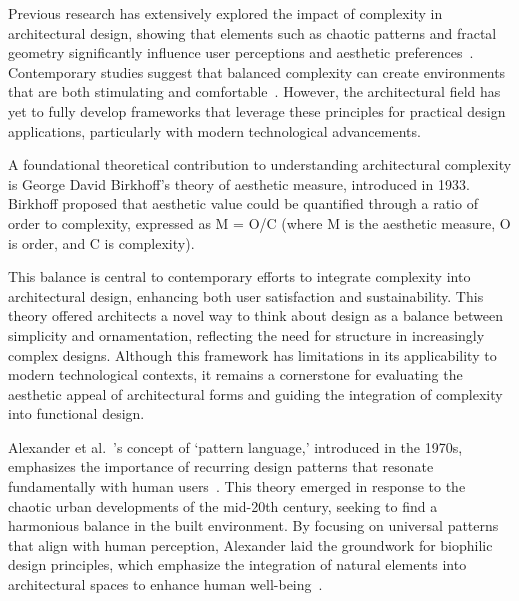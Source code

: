 

Previous research has extensively explored the impact of complexity in architectural design, showing that elements such as chaotic patterns and fractal geometry significantly influence user perceptions and aesthetic preferences~\cite{Bies2016}.
Contemporary studies suggest that balanced complexity can create environments that are both stimulating and comfortable~\cite{Redies2015}.
However, the architectural field has yet to fully develop frameworks that leverage these principles for practical design applications, particularly with modern technological advancements.

A foundational theoretical contribution to understanding architectural complexity is George David Birkhoff's theory of aesthetic measure, introduced in 1933.
Birkhoff proposed that aesthetic value could be quantified through a ratio of order to complexity, expressed as M = O/C (where M is the aesthetic measure, O is order, and C is complexity)\cite{Douchova2016}.

This balance is central to contemporary efforts to integrate complexity into architectural design, enhancing both user satisfaction and sustainability.
This theory offered architects a novel way to think about design as a balance between simplicity and ornamentation, reflecting the need for structure in increasingly complex designs.
Although this framework has limitations in its applicability to modern technological contexts, it remains a cornerstone for evaluating the aesthetic appeal of architectural forms and guiding the integration of complexity into functional design\cite{Javaheri2016}.

Alexander et al.~’s concept of `pattern language,' introduced in the 1970s, emphasizes the importance of recurring design patterns that resonate fundamentally with human users~\cite{Alexander1977}.
This theory emerged in response to the chaotic urban developments of the mid-20th century, seeking to find a harmonious balance in the built environment.
By focusing on universal patterns that align with human perception, Alexander laid the groundwork for biophilic design principles, which emphasize the integration of natural elements into architectural spaces to enhance human well-being~\cite{Downton2017}.

